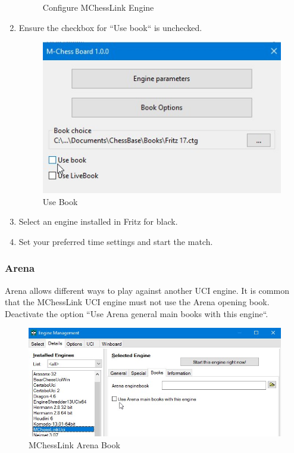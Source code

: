 \documentclass[11pt,a4paper]{article}
\begin{document}
\begin{enumerate}
\begin{figure}[H]
		\caption{Configure MChessLink Engine}
		\label{fig:FritzConfigureCertabo}
	\end{figure}

	\item Ensure the checkbox for ``Use book`` is unchecked.
		\begin{figure}[H]
		\centering
		\includegraphics[scale=0.8]{fritz_engineusebook.jpg}
		\caption{Use Book}
		\label{fig:FritzUseBook}
	\end{figure}
	\item Select an engine installed in Fritz for black.
	\item Set your preferred time settings and start the match.	
\end{enumerate}

\subsubsection{Arena}
Arena allows different ways to play against another UCI engine. It is common that the MChessLink UCI engine must not use the Arena opening book. Deactivate the option ``Use Arena general main books with this engine``.
\begin{figure}[H]
	\centering
	\includegraphics[scale=0.7]{arena_mainbooks.jpg}
	\caption{MChessLink Arena Book}
	\label{fig:ArenaUseBook}
\end{figure}
\end{document}
